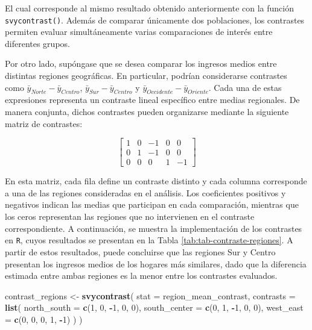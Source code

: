 \documentclass[
  spanish,
  12pt,
]{book}
\newenvironment{Shaded}{\begin{snugshade}}{\end{snugshade}}
\newcommand{\AttributeTok}[1]{\textcolor[rgb]{0.13,0.29,0.53}{#1}}
\newcommand{\DecValTok}[1]{\textcolor[rgb]{0.00,0.00,0.81}{#1}}
\newcommand{\FunctionTok}[1]{\textcolor[rgb]{0.13,0.29,0.53}{\textbf{#1}}}
\newcommand{\NormalTok}[1]{#1}
\newcommand{\OtherTok}[1]{\textcolor[rgb]{0.56,0.35,0.01}{#1}}
\newcommand{\SpecialCharTok}[1]{\textcolor[rgb]{0.81,0.36,0.00}{\textbf{#1}}}
\begin{document}
El cual corresponde al mismo resultado obtenido anteriormente con la función \texttt{svycontrast()}. Además de comparar únicamente dos poblaciones, los contrastes permiten evaluar simultáneamente varias comparaciones de interés entre diferentes grupos.

Por otro lado, supóngase que se desea comparar los ingresos medios entre distintas regiones geográficas. En particular, podrían considerarse contrastes como \(\bar{y}_{Norte} - \bar{y}_{Centro}\), \(\bar{y}_{Sur} - \bar{y}_{Centro}\) y \(\bar{y}_{Occidente} - \bar{y}_{Oriente}\). Cada una de estas expresiones representa un contraste lineal específico entre medias regionales. De manera conjunta, dichos contrastes pueden organizarse mediante la siguiente matriz de contrastes:

\[
\left[\begin{array}{ccccc}
1 & 0 & -1 & 0 & 0\\
0 & 1 & -1 & 0 & 0\\
0 & 0 & 0 & 1 & -1
\end{array}\right]
\]

En esta matriz, cada fila define un contraste distinto y cada columna corresponde a una de las regiones consideradas en el análisis. Los coeficientes positivos y negativos indican las medias que participan en cada comparación, mientras que los ceros representan las regiones que no intervienen en el contraste correspondiente. A continuación, se muestra la implementación de los contrastes en \texttt{R}, cuyos resultados se presentan en la Tabla \ref{tab:tab-contraste-regiones}. A partir de estos resultados, puede concluirse que las regiones Sur y Centro presentan los ingresos medios de los hogares más similares, dado que la diferencia estimada entre ambas regiones es la menor entre los contrastes evaluados.

\begin{Shaded}
\begin{Highlighting}[]
\NormalTok{contrast\_regions }\OtherTok{\textless{}{-}} \FunctionTok{svycontrast}\NormalTok{(}
  \AttributeTok{stat =}\NormalTok{ region\_mean\_contrast,}
  \AttributeTok{contrasts =} \FunctionTok{list}\NormalTok{(}
    \AttributeTok{north\_south =} \FunctionTok{c}\NormalTok{(}\DecValTok{1}\NormalTok{, }\DecValTok{0}\NormalTok{, }\SpecialCharTok{{-}}\DecValTok{1}\NormalTok{, }\DecValTok{0}\NormalTok{, }\DecValTok{0}\NormalTok{),}
    \AttributeTok{south\_center =} \FunctionTok{c}\NormalTok{(}\DecValTok{0}\NormalTok{, }\DecValTok{1}\NormalTok{, }\SpecialCharTok{{-}}\DecValTok{1}\NormalTok{, }\DecValTok{0}\NormalTok{, }\DecValTok{0}\NormalTok{),}
    \AttributeTok{west\_east =} \FunctionTok{c}\NormalTok{(}\DecValTok{0}\NormalTok{, }\DecValTok{0}\NormalTok{, }\DecValTok{0}\NormalTok{, }\DecValTok{1}\NormalTok{, }\SpecialCharTok{{-}}\DecValTok{1}\NormalTok{)}
\NormalTok{  )}
\NormalTok{)}
\end{Highlighting}
\end{Shaded}
\end{document}
